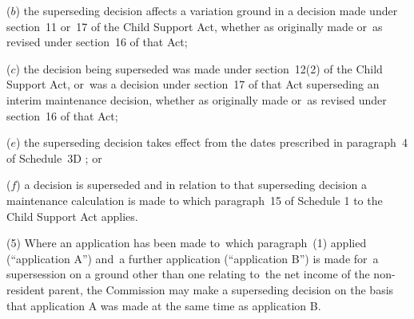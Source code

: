 \documentclass[12pt,a4paper]{article}
\begin{document}
{\begin{enumerate}
($b$) the superseding decision affects a variation ground in a decision made under section~11 or~17 of the Child Support Act, whether as originally made or~as revised under section~16 of that Act;

($c$) the decision being superseded was made under section~12(2) of the Child Support Act, or~was a decision under section~17 of that Act superseding an interim maintenance decision, whether as originally made or~as revised under section~16 of that Act;
%

($e$) the superseding decision takes effect from the dates prescribed in 
paragraph~4 of Schedule~3D%
% 
; or

($f$) a decision is superseded and in relation to that superseding decision a maintenance calculation is made to which paragraph~15 of Schedule 1 to the Child Support Act applies.
\end{enumerate}

(5) Where an application has been made to~which paragraph~(1) applied (“application A”) and~a further application (“application B”) is made for~a supersession on a ground other than one relating to~the net income of the non-resident parent, the 
Commission  %
may make a superseding decision on the basis that application A was made at the same time as application B.

}
\end{document}
